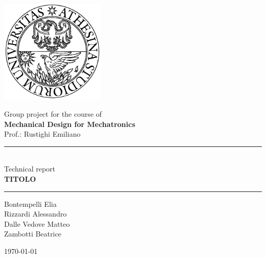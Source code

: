 \documentclass[11pt,a4paper]{article}
\begin{document}
	
	\thispagestyle{empty}
	\begin{center}
		\includegraphics[width=5cm]{logouni}
		\vspace{2cm}
		
		{\Large Group project for the course of \\ \vspace{3mm}
		\textbf{Mechanical Design for Mechatronics} \\ \vspace{1cm}
		Prof.: Rustighi Emiliano} \vspace{1cm}
	
		\rule{5cm}{0.5pt} \\ \vspace{1cm}
		{\Large Technical report} \\ \vspace{3mm}
		{\LARGE \textbf{TITOLO}} \\ \vspace{1cm}
		
		\rule{5cm}{0.5pt} \vspace{1cm}
		
		\begin{multicols}{2}
			Bontempelli Elia \\
			Rizzardi Alessandro \\
			Dalle Vedove Matteo \\
			Zambotti Beatrice
		\end{multicols}
		\vspace{1cm}
		
		\today
		
	\end{center}
	
	\newpage
	\tableofcontents
	
	\newpage
	
	\setcounter{page}{1}
	
	
	
	
\end{document}
